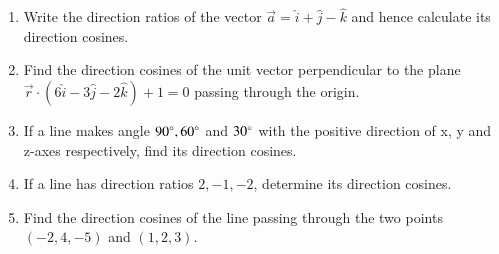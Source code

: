 \begin{enumerate}[label=\thesubsection.\arabic*, ref=\thesubsection.\theenumi]
\item Write the direction ratios of the vector $\overrightarrow{a} = \hat{i} +\hat{j} -\hat{k}$ and hence calculate its direction cosines.
\item Find the direction cosines of the unit vector perpendicular to the plane $\overrightarrow{r} \cdot(6 \hat{i}- 3 \hat{j}- 2 \hat{k})+ 1= 0$ passing through the origin.
\item If a line makes angle $90 \degree, 60 \degree$ and $30 \degree$ with the positive direction of x, y and z-axes respectively, find its direction cosines.
\item If a line has direction ratios $2, -1, -2$, determine its direction cosines.
\item Find the direction cosines of the line passing through the two points $(-2, 4, -5)$ and $(1, 2, 3)$.
\end{enumerate}
